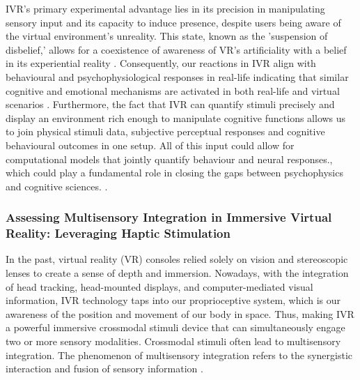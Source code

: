 \documentclass[12pt,oneside,openright]{report}
\begin{document}
IVR's primary experimental advantage lies in its precision in manipulating sensory input and its capacity to induce presence, despite users being aware of the virtual environment's unreality. This state, known as the 'suspension of disbelief,' allows for a coexistence of awareness of VR's artificiality with a belief in its experiential reality \parencite{Slater2009PlaceIA}. Consequently, our reactions in IVR align with behavioural and psychophysiological responses in real-life indicating that similar cognitive and emotional mechanisms are activated in both real-life and virtual scenarios \parencite{Vasser2020GuidelinesFI, deGelder2018VirtualRA}. Furthermore, the fact that IVR can quantify stimuli precisely and display an environment rich enough to manipulate cognitive functions allows us to join physical stimuli data, subjective perceptual responses and cognitive behavioural outcomes in one setup. All of this input could allow for computational models that jointly quantify behaviour and neural responses., which could play a fundamental role in closing the gaps between psychophysics and cognitive sciences. \parencite{WASKOM2019100}. 


\subsubsection*{Assessing Multisensory Integration in Immersive Virtual Reality: Leveraging Haptic Stimulation}

In the past, virtual reality (VR) consoles relied solely on vision and stereoscopic lenses to create a sense of depth and immersion. Nowadays, with the integration of head tracking, head-mounted displays, and computer-mediated visual information, IVR technology taps into our proprioceptive system, which is our awareness of the position and movement of our body in space. Thus, making IVR a powerful immersive crossmodal stimuli device that can simultaneously engage two or more sensory modalities. Crossmodal stimuli often lead to multisensory integration. The phenomenon of multisensory integration refers to the synergistic interaction and fusion of sensory information \parencite{Stein2008MultisensoryIC}.
\end{document}
